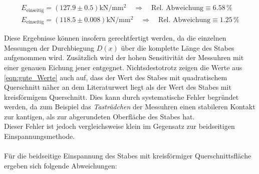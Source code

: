 \begin{gather}
\label{eqn:gute_Werte}
    E_\text{einseitig} = \left(127.9   \pm 0.5  \right)\unit{\kilo \newton \per \milli \meter \squared}\quad \Rightarrow \quad \text{Rel. Abweichung} \equiv 6.58\,\unit{\percent}\\
    E_\text{einseitig} = \left(118.5   \pm 0.008\right)\unit{\kilo \newton \per \milli \meter \squared}\quad \Rightarrow \quad \text{Rel. Abweichung} \equiv 1.25\,\unit{\percent}
\end{gather}

\noindent Diese Ergebnisse können insofern gerechtfertigt werden, da die einzelnen Messungen der Durchbiegung $D(x)$ über die komplette Länge 
des Stabes aufgenommen wird. Zusätzlich wird der hohen Sensitivität der Messuhren mit einer genauen Eichung jener entgegnet.
Nichtsdestotrotz zeigen die Werte aus \eqref{eqn:gute_Werte} auch auf, dass der Wert des Stabes mit quadratischem Querschnitt näher an dem
Literaturwert liegt als der Wert des Stabes mit kreisförmigem Querschnitt. Dies kann durch systematische Fehler begründet werden, da zum Beispiel das
\emph{Tasträdchen} der Messuhren einen stabileren Kontakt zur kantigen, als zur abgerundeten Oberfläche des Stabes hat.\\
Dieser Fehler ist jedoch vergleichsweise klein im Gegensatz zur beidseitigen Einspannungsmethode.\\\\
Für die beidseitige Einspannung des Stabes mit kreisförmiger Querschnittsfläche ergeben sich folgende Abweichungen:

